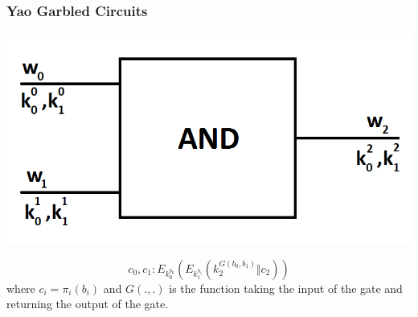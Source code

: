 \documentclass{beamer}
\begin{document}
% 
% 
% 
% 

	\begin{frame}
		\frametitle{Yao Garbled Circuits}
		\centering
		\includegraphics[scale=0.4]{Images/BasicGarbling}

		$$c_0, c_1 : E_{k_0^{b_0}}(E_{k_1^{b_1}}(k_2^{G(b_0, b_1)} \Vert c_2))$$
		where $c_i = \pi_i(b_i)$ and $G(., .)$ is the function taking the input of the gate and returning the output of the gate.
	\end{frame}
\end{document}

